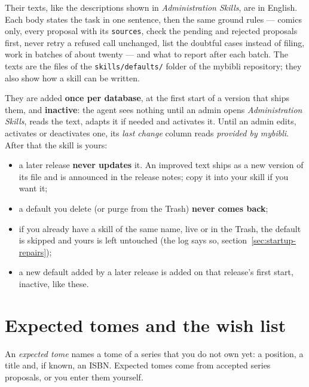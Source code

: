 Their texts, like the descriptions shown in \emph{Administration
\textrightarrow{} Skills}, are in English. Each body states the task in one sentence, then the
same ground rules
--- comics only, every proposal with its \texttt{sources}, check the
pending and rejected proposals first, never retry a refused call
unchanged, list the doubtful cases instead of filing, work in batches of
about twenty --- and what to report after each batch. The texts are
the files of the \texttt{skills/defaults/} folder of the mybibli
repository; they also show how a skill can be written.

They are added \textbf{once per database}, at the first start of a
version that ships them, and \textbf{inactive}: the agent sees nothing
until an admin opens \emph{Administration \textrightarrow{} Skills},
reads the text, adapts it if needed and activates it. Until an admin
edits, activates or deactivates one, its \emph{last change} column
reads \emph{provided by mybibli}. After that the skill is yours:

\begin{itemize}
  \item a later release \textbf{never updates} it. An improved text
        ships as a new version of its file and is announced in the
        release notes; copy it into your skill if you want it;
  \item a default you delete (or purge from the Trash) \textbf{never
        comes back};
  \item if you already have a skill of the same name, live or in the
        Trash, the default is skipped and yours is left untouched (the
        log says so, section~\ref{sec:startup-repairs});
  \item a new default added by a later release is added on that
        release's first start, inactive, like these.
\end{itemize}

\section{Expected tomes and the wish list}
\label{sec:expected-tomes}

An \emph{expected tome} names a tome of a series
that you do not own yet: a position, a title and, if known, an ISBN.
Expected tomes come from accepted series proposals, or you enter them
yourself.

